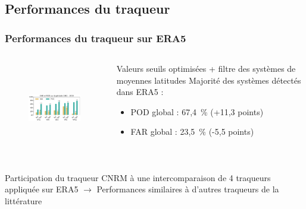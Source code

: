 \documentclass[aspectratio=169, usepdftitle=false, xcolor={dvipsnames}, 9pt,table]{beamer}
\begin{document}
\subsection*{Performances du traqueur}
\begin{frame}[t]
    \frametitle{Performances du traqueur sur ERA5}
    \footnotesize
    \begin{columns}
        \begin{column}{0.56\textwidth}
        \footnotesize
        \begin{figure}
            \centering
            \includegraphics[height=4cm]{Figures/far_pod_avant_apres.png}
        \end{figure}
        \end{column}
        \begin{column}{0.4\linewidth}
        \footnotesize
        \vspace{-1em}
        \begin{block}        
            Valeurs seuils \alert{optimisées} + filtre des systèmes de moyennes latitudes \parencite{hart_cyclone_2003}
            \tcblower
            \setlength{\leftmargini}{2.5ex}
            \alert{Majorité} des systèmes détectés dans ERA5 :
            \begin{itemize}
                \item POD global : 67,4~\% (+11,3 points)
                \item FAR global : 23,5~\% (-5,5 points)
            \end{itemize}
        \end{block}
        \end{column}
    \end{columns}
    \vspace{1em}
    \begin{examples}    
        Participation du traqueur CNRM à une \alert{intercomparaison} de 4 traqueurs appliquée sur ERA5 \parencite{bourdin_intercomparison_2022}
        \tcblower
        $\longrightarrow$ Performances similaires à d'autres traqueurs de la littérature
    \end{examples}
\end{frame}
\end{document}
